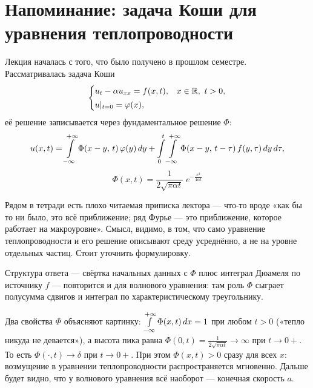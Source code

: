 \section*{Напоминание: задача Коши для уравнения теплопроводности}

Лекция началась с того, что было получено в прошлом семестре. Рассматривалась задача
Коши
\[
  \begin{cases}
    u_t - \alpha u_{xx} = f(x,t), & x \in \mathbb{R},\ t > 0, \\[2pt]
    u|_{t=0} = \varphi(x),
  \end{cases}
\]
её решение записывается через фундаментальное решение $\Phi$:
\[
  u(x,t) = \int\limits_{-\infty}^{+\infty} \Phi(x-y,\,t)\,\varphi(y)\,dy
         + \int\limits_0^t \int\limits_{-\infty}^{+\infty} \Phi(x-y,\,t-\tau)\,f(y,\tau)\,dy\,d\tau ,
\]
\[
  \boxed{\ \Phi(x,t) = \frac{1}{2\sqrt{\pi \alpha t}}\;
         e^{-\frac{x^2}{4\alpha t}}\ }
\]


\begin{warn}
Рядом в тетради есть плохо читаемая приписка лектора — что-то вроде «как бы то
ни было, это всё приближение; ряд Фурье — это приближение, которое работает на
макроуровне». Смысл, видимо, в том, что само уравнение теплопроводности и его
решение описывают среду усреднённо, а не на уровне отдельных частиц. Стоит
уточнить формулировку.
\end{warn}

\begin{idea}
Структура ответа — свёртка начальных данных с $\Phi$ плюс интеграл Дюамеля по
источнику $f$ — повторится и для волнового уравнения: там роль $\Phi$ сыграет
полусумма сдвигов и интеграл по характеристическому треугольнику.

\medskip
Два свойства $\Phi$ объясняют картинку: $\int\limits_{-\infty}^{+\infty} \Phi(x,t)\,dx = 1$ при любом $t>0$
(«тепло никуда не девается»), а высота пика равна
$\Phi(0,t) = \frac{1}{2\sqrt{\pi\alpha t}} \to \infty$ при $t \to 0+$. То есть
$\Phi(\cdot,t) \to \delta$ при $t \to 0+$. При этом $\Phi(x,t) > 0$ сразу для всех
$x$: возмущение в уравнении теплопроводности распространяется мгновенно. Дальше
будет видно, что у волнового уравнения всё наоборот — конечная скорость $a$.
\end{idea}
